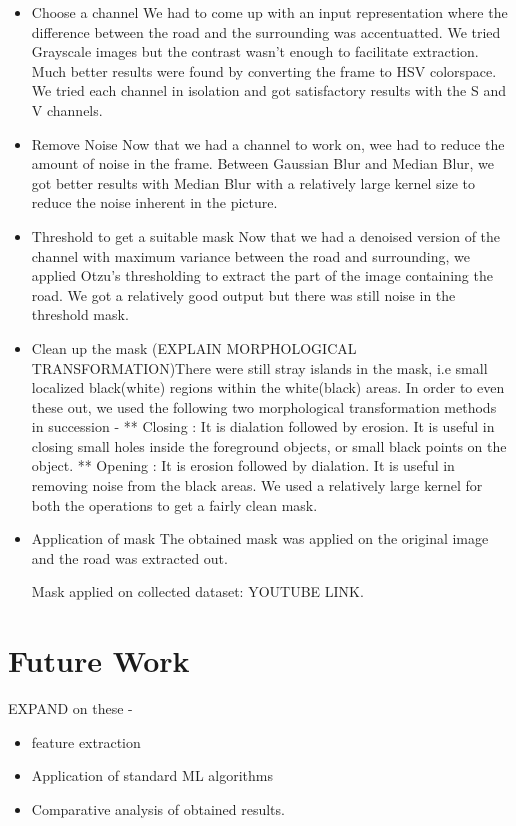 \documentclass[12pt,a4paper]{article}
\begin{document}
\begin{itemize}

\item Choose a channel
    We had to come up with an input representation where the difference between the road and the surrounding was accentuatted. We tried Grayscale images but the contrast wasn't enough to facilitate extraction. Much better results were found by converting the frame to HSV colorspace. We tried each channel in isolation and got satisfactory results with the S and V channels. 

\item Remove Noise
    Now that we had a channel to work on, wee had to reduce the amount of noise in the frame. Between Gaussian Blur and Median Blur, we got better results with Median Blur with a relatively large kernel size to reduce the noise inherent in the picture. 

\item Threshold to get a suitable mask
    Now that we had a denoised version of the channel with maximum variance between the road and surrounding, we applied Otzu's thresholding to extract the part of the image containing the road. We got a relatively good output but there was still noise in the threshold mask.
    
\item Clean up the mask
    (EXPLAIN MORPHOLOGICAL TRANSFORMATION)There were still stray islands in the mask, i.e small localized black(white) regions within the white(black) areas. In order to even these out, we used the following two morphological transformation methods in succession -
    ** Closing : It is dialation followed by erosion. It is useful in closing small holes inside the foreground objects, or small black points on the object.
    ** Opening : It is erosion followed by dialation. It is useful in removing noise from the black areas.
    We used a relatively large kernel for both the operations to get a fairly clean mask.
    
\item Application of mask
    The obtained mask was applied on the original image and the road was extracted out. 

    Mask applied on collected dataset: YOUTUBE LINK.
    
\end{itemize}

\section{Future Work}
EXPAND on these  - 
\begin{itemize}
\item feature extraction
\item Application of standard ML algorithms
\item Comparative analysis of obtained results.
\end{itemize}
\end{document}
